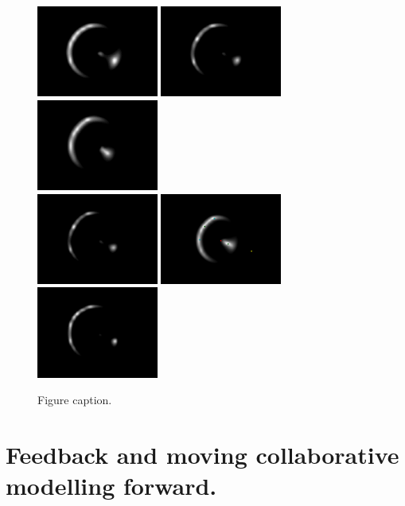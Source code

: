 \documentclass{article}
\begin{document}
\begin{figure}
\includegraphics[width=113pt]{fig/simsModeling-fig016.png}
\includegraphics[width=113pt]{fig/simsModeling-fig017.png}
\includegraphics[width=113pt]{fig/simsModeling-fig018.png} \\
\includegraphics[width=113pt]{fig/simsModeling-fig019.png}
\includegraphics[width=113pt]{fig/simsModeling-fig020.png}
\includegraphics[width=113pt]{fig/simsModeling-fig021.png}
\caption{Figure caption.}
\end{figure}

\section{Feedback and moving collaborative modelling forward.}
\end{document}
